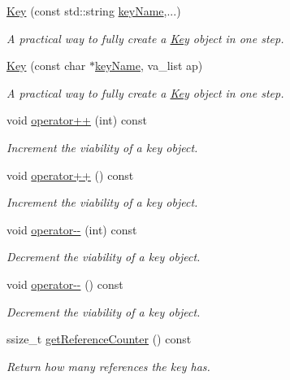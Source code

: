 \begin{DoxyCompactItemize}
\hyperlink{classkdb_1_1Key_acbf7642258d46da2c4427f4104cf01ee}{Key} (const std\-::string \hyperlink{group__keyname_ga8e805c726a60da921d3736cda7813513}{key\-Name},...)
\begin{DoxyCompactList}\small\item\em A practical way to fully create a \hyperlink{classkdb_1_1Key}{Key} object in one step.  \end{DoxyCompactList}\item 
\hyperlink{classkdb_1_1Key_aa0dc94c7e676a0d280e5817e4c6238d3}{Key} (const char $\ast$\hyperlink{group__keyname_ga8e805c726a60da921d3736cda7813513}{key\-Name}, va\-\_\-list ap)
\begin{DoxyCompactList}\small\item\em A practical way to fully create a \hyperlink{classkdb_1_1Key}{Key} object in one step.  \end{DoxyCompactList}\item 
void \hyperlink{classkdb_1_1Key_a31f7139c5378b3fde4dfab4955208d23}{operator++} (int) const 
\begin{DoxyCompactList}\small\item\em Increment the viability of a key object.  \end{DoxyCompactList}\item 
void \hyperlink{classkdb_1_1Key_ab017ed5e104e441d86725f61439d1f24}{operator++} () const 
\begin{DoxyCompactList}\small\item\em Increment the viability of a key object.  \end{DoxyCompactList}\item 
void \hyperlink{classkdb_1_1Key_acbb63da4ab49c66c851228511c000ec7}{operator-\/-\/} (int) const 
\begin{DoxyCompactList}\small\item\em Decrement the viability of a key object.  \end{DoxyCompactList}\item 
void \hyperlink{classkdb_1_1Key_afa095fe7021b7ca01e6224b976449b3f}{operator-\/-\/} () const 
\begin{DoxyCompactList}\small\item\em Decrement the viability of a key object.  \end{DoxyCompactList}\item 
ssize\-\_\-t \hyperlink{classkdb_1_1Key_a213fb46e13b669cc862fce06ac361b79}{get\-Reference\-Counter} () const 
\begin{DoxyCompactList}\small\item\em Return how many references the key has.  \end{DoxyCompactList}\item 

\end{DoxyCompactItemize}
